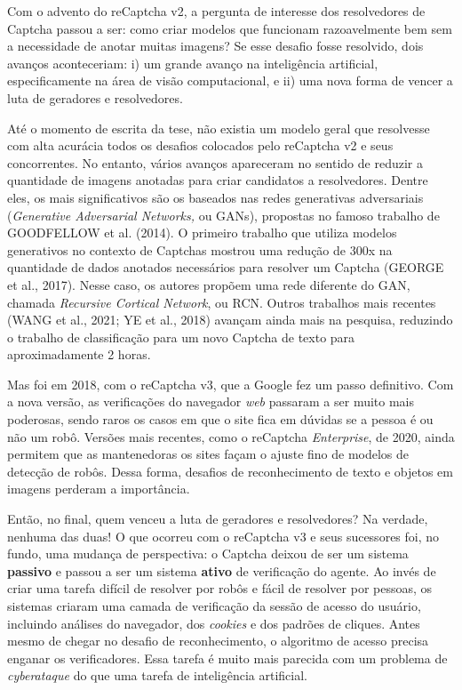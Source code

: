 \documentclass[12pt,twoside,brazilian]{book}
\begin{document}
Com o advento do reCaptcha v2, a pergunta de interesse dos resolvedores
de Captcha passou a ser: como criar modelos que funcionam razoavelmente
bem sem a necessidade de anotar muitas imagens? Se esse desafio fosse
resolvido, dois avanços aconteceriam: i) um grande avanço na
inteligência artificial, especificamente na área de visão computacional,
e ii) uma nova forma de vencer a luta de geradores e resolvedores.

Até o momento de escrita da tese, não existia um modelo geral que
resolvesse com alta acurácia todos os desafios colocados pelo reCaptcha
v2 e seus concorrentes. No entanto, vários avanços apareceram no sentido
de reduzir a quantidade de imagens anotadas para criar candidatos a
resolvedores. Dentre eles, os mais significativos são os baseados nas
redes generativas adversariais (\emph{Generative Adversarial Networks,}
ou GANs), propostas no famoso trabalho de GOODFELLOW et al. (2014). O
primeiro trabalho que utiliza modelos generativos no contexto de
Captchas mostrou uma redução de 300x na quantidade de dados anotados
necessários para resolver um Captcha (GEORGE et al., 2017). Nesse caso,
os autores propõem uma rede diferente do GAN, chamada \emph{Recursive
Cortical Network}, ou RCN. Outros trabalhos mais recentes (WANG et al.,
2021; YE et al., 2018) avançam ainda mais na pesquisa, reduzindo o
trabalho de classificação para um novo Captcha de texto para
aproximadamente 2 horas.

Mas foi em 2018, com o reCaptcha v3, que a Google fez um passo
definitivo. Com a nova versão, as verificações do navegador \emph{web}
passaram a ser muito mais poderosas, sendo raros os casos em que o site
fica em dúvidas se a pessoa é ou não um robô. Versões mais recentes,
como o reCaptcha \emph{Enterprise}, de 2020, ainda permitem que as
mantenedoras os sites façam o ajuste fino de modelos de detecção de
robôs. Dessa forma, desafios de reconhecimento de texto e objetos em
imagens perderam a importância.

Então, no final, quem venceu a luta de geradores e resolvedores? Na
verdade, nenhuma das duas! O que ocorreu com o reCaptcha v3 e seus
sucessores foi, no fundo, uma mudança de perspectiva: o Captcha deixou
de ser um sistema \textbf{passivo} e passou a ser um sistema
\textbf{ativo} de verificação do agente. Ao invés de criar uma tarefa
difícil de resolver por robôs e fácil de resolver por pessoas, os
sistemas criaram uma camada de verificação da sessão de acesso do
usuário, incluindo análises do navegador, dos \emph{cookies} e dos
padrões de cliques. Antes mesmo de chegar no desafio de reconhecimento,
o algoritmo de acesso precisa enganar os verificadores. Essa tarefa é
muito mais parecida com um problema de \emph{cyberataque} do que uma
tarefa de inteligência artificial.
\end{document}
